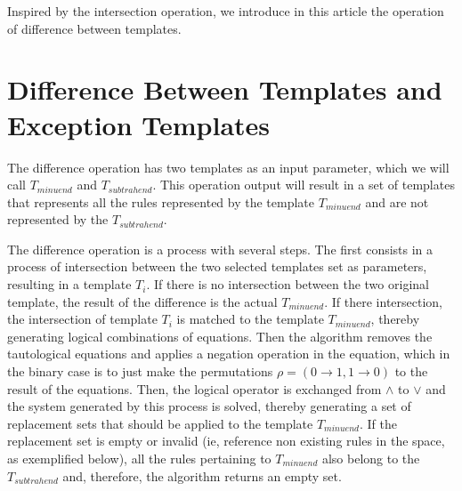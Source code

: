 \documentclass{llncs}
\begin{document}
Inspired by the intersection operation, we introduce in this article the operation of difference between templates.

\section{Difference Between Templates and Exception Templates}
\label{sec:diferenca_entre_templates_e_templates_de_excecao}

The difference operation has two templates as an input parameter, which we will call $T_{minuend}$ and $T_{subtrahend}$. This operation output will result in a set of templates that represents all the rules represented by the template $T_{minuend}$ and are not represented by the $T_{subtrahend}$.

The difference operation is a process with several steps. The first consists in a process of intersection between the two selected templates set as parameters, resulting in a template $T_i$. If there is no intersection between the two original template, the result of the difference is the actual $T_{minuend}$. If there intersection, the intersection of template $T_i$ is matched to the template $T_{minuend}$, thereby generating logical combinations of equations. Then the algorithm removes the tautological equations and applies a negation operation in the equation, which in the binary case is to just make the permutations $\rho = (0 \to 1, 1 \to 0)$ to the result of the equations. Then, the logical operator is exchanged from $\wedge$ to $\vee$ and the system generated by this process is solved, thereby generating a set of replacement sets that should be applied to the template $T_{minuend}$. If the replacement set is empty or invalid (ie, reference non existing rules in the space, as exemplified below), all the rules pertaining to $T_{minuend}$ also belong to the $T_{subtrahend}$ and, therefore, the algorithm returns an empty set.
\end{document}
